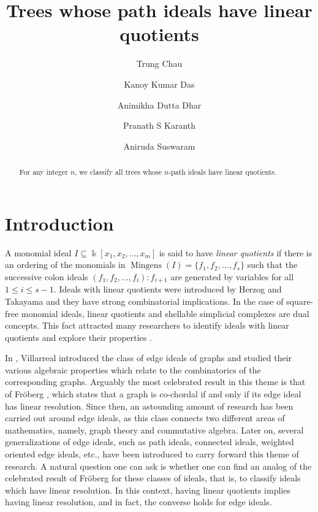 \documentclass{amsart}
\title{Trees whose path ideals have linear quotients}
\author[Chau]{Trung Chau}
\author[Das]{Kanoy Kumar Das}
\author[Dutta Dhar]{Animikha Dutta Dhar}
\author[Karanth]{Pranath S Karanth}
\author[Suswaram]{Aniruda Suswaram}
\theoremstyle{remark}
\theoremstyle{definition}
\DeclareMathOperator{\mingens}{Mingens}
\begin{document}
	
    \begin{abstract}
    For any integer $n$, we classify all trees whose $n$-path ideals have linear quotients. 
    \end{abstract}

    \maketitle

	
	
	\section{Introduction}
	A monomial ideal $I\subseteq \Bbbk[x_1,x_2,\dots , x_m]$ is said to have \emph{linear quotients} if there is an ordering of the monomials in $\mingens(I)=\{f_1, f_2, \dots , f_s\}$ such that the successive colon ideals $(f_1,f_2, \dots , f_i):f_{i+1}$ are generated by variables for all $1\leq i\leq s-1$. Ideals with linear quotients were introduced by Herzog and Takayama \cite{HerzogTakayama2002} and they have strong combinatorial implications. In the case of square-free monomial ideals, linear quotients and shellable simplicial complexes are dual concepts. This fact attracted many researchers to identify ideals with linear quotients and explore their properties \cite{ JahanZheng2010,SharifanVarbaro2008}. 

    In \cite{Villarreal1990}, Villarreal introduced the class of edge ideals of graphs and studied their various algebraic properties which relate to the combinatorics of the corresponding graphs. Arguably the most celebrated result in this theme is that of Fr\"oberg \cite{Froberg}, which states that a graph is co-chordal if and only if its edge ideal has linear resolution. Since then, an astounding amount of research has been carried out around edge ideals, as this class connects two different areas of mathematics, namely, graph theory and commutative algebra. Later on, several generalizations of edge ideals, such as path ideals, connected ideals, weighted oriented edge ideals, etc., have been introduced to carry forward this theme of research. A natural question one can ask is whether one can find an analog of the celebrated result of Fr\"oberg \cite{Froberg} for these classes of ideals, that is, to classify ideals which have linear resolution. In this context, having linear quotients implies having linear resolution, and in fact, the converse holds for edge ideals. 
    
\end{document}
